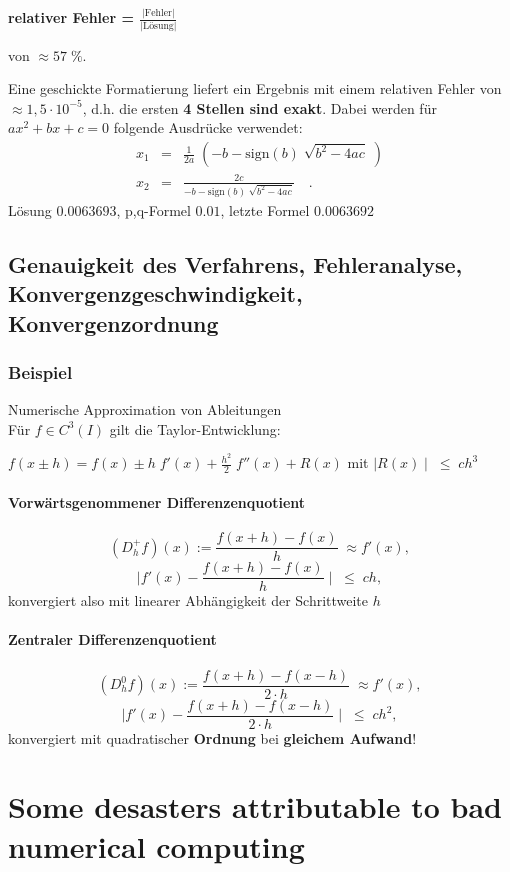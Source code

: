 \documentclass[ngerman,fontsize=11pt, paper=a4, parskip=half, titlepage=true, toc=bib]{scrbook}
\theoremstyle{definition}
\theoremstyle{plain}
\begin{document}
{\bf{relativer} \bf{Fehler} = $\frac{|\mbox{Fehler}|}{|\mbox{Lösung}|}$}

von        $\approx 57 \; \%$.

Eine geschickte Formatierung liefert ein Ergebnis mit einem
relativen Fehler von $\approx 1,5 \cdot 10^{-5}$,
d.h. die ersten \textbf{4 Stellen sind exakt}. 
Dabei werden für $ax^2 + bx + c = 0$ folgende Ausdrücke verwendet:
\begin{align*}
  x_1 &=& \tfrac{1}{2a} \; (- b - \mbox{sign}(b) \; \sqrt{b^2 -
          4ac}\;)\\
  x_2& =  &\tfrac{2c}{- b - \mbox{sign}(b) \; \sqrt{b^2 - 4ac}} \quad .
\end{align*}
Lösung $0.0063693$, p,q-Formel $0.01$,
letzte Formel $0.0063692$

\subsection*{Genauigkeit des Verfahrens, Fehleranalyse,
  Konvergenzgeschwindigkeit, Konvergenzordnung}

\subsubsection{Beispiel}
Numerische Approximation von Ableitungen \\
Für $f \in C^3(I)$ gilt die Taylor-Entwicklung:

$f(x \pm h) = f(x) \pm h \; f'(x) + \frac{h^2}{2} \; f''(x) +
R(x)$ mit $\mid R(x) \mid \; \leq \; c   h^3$

\paragraph{Vorwärtsgenommener Differenzenquotient}
$$ (D_h^+f)(x):= \frac{f(x + h) - f(x)}{h} \; \approx f'(x), $$
$$\mid f'(x) - \frac{f(x + h) - f(x)}{h} \mid \; \leq \; c h, $$
konvergiert also mit linearer Abhängigkeit der
Schrittweite $h$  
\paragraph{Zentraler Differenzenquotient}
$$(D_h^0f) (x):= \frac{f(x + h) - f(x-h)}{2 \cdot h} \; \approx
f'(x),$$
$$\mid f'(x) - \frac{f(x + h) - f(x - h)}{2 \cdot h} \mid \;
\leq \; c h^2, $$
konvergiert mit quadratischer \textbf{Ordnung} bei
\textbf{gleichem Aufwand}!


\section*{Some desasters attributable to bad numerical computing}
\end{document}
